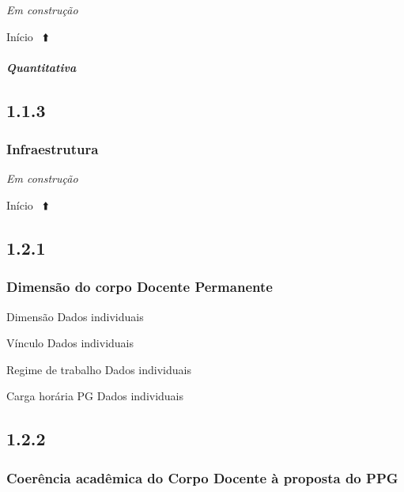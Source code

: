 \documentclass[
  a4paper,
]{book}
\begin{document}
\emph{Em construção}

Início ~⬆️

\hypertarget{quantitativa}{%
\paragraph{\texorpdfstring{\emph{Quantitativa}}{Quantitativa}}\label{quantitativa}}

\hypertarget{section-2}{%
\subsection{\texorpdfstring{\textbf{1.1.3}}{1.1.3}}\label{section-2}}

\hypertarget{infraestrutura}{%
\subsubsection{\texorpdfstring{\textbf{Infraestrutura}}{Infraestrutura}}\label{infraestrutura}}

\emph{Em construção}

Início ~⬆️

\hypertarget{section-3}{%
\subsection{\texorpdfstring{\textbf{1.2.1}}{1.2.1}}\label{section-3}}

\hypertarget{dimensuxe3o-do-corpo-docente-permanente}{%
\subsubsection{\texorpdfstring{\textbf{Dimensão do corpo Docente Permanente}}{Dimensão do corpo Docente Permanente}}\label{dimensuxe3o-do-corpo-docente-permanente}}

Dimensão \textbar{} Dados individuais

Vínculo \textbar{} Dados individuais

Regime de trabalho \textbar{} Dados individuais

Carga horária PG \textbar{} Dados individuais

\hypertarget{section-4}{%
\subsection{\texorpdfstring{\textbf{1.2.2}}{1.2.2}}\label{section-4}}

\hypertarget{coeruxeancia-acaduxeamica-do-corpo-docente-uxe0-proposta-do-ppg}{%
\subsubsection{\texorpdfstring{\textbf{Coerência acadêmica do Corpo Docente à proposta do PPG}}{Coerência acadêmica do Corpo Docente à proposta do PPG}}\label{coeruxeancia-acaduxeamica-do-corpo-docente-uxe0-proposta-do-ppg}}
\end{document}
